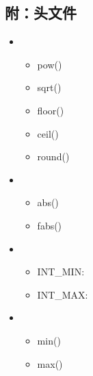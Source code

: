 \documentclass[letterpaper,10pt,english]{sphinxmanual}
\begin{document}
\begin{DUlineblock}{0em}
\item[] 
\end{DUlineblock}


\subsection{附：头文件}
\label{\detokenize{cpp/18_commonFunc:id2}}\begin{itemize}
\item {} 
\begin{itemize}
\item {} 
pow()

\item {} 
sqrt()

\item {} 
floor()

\item {} 
ceil()

\item {} 
round()

\end{itemize}

\item {} 
\begin{itemize}
\item {} 
abs()

\item {} 
fabs()

\end{itemize}

\item {} 
\begin{itemize}
\item {} 
INT\_MIN: 

\item {} 
INT\_MAX: 

\end{itemize}

\item {} 
\begin{itemize}
\item {} 
min()

\item {} 
max()

\end{itemize}


\end{itemize}
\end{document}
